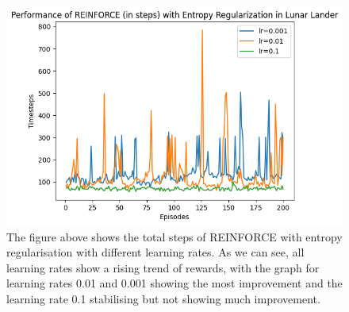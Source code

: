 \documentclass{article}
\begin{document}
\begin{figure}[htbp]
\centering
\includegraphics[width=0.9\linewidth]{Report/images/entropy_regularisation_2.png}
\caption{\label{fig:ReinforceEntropy_Rewards_Steps}The figure above shows the total steps of REINFORCE with entropy regularisation with different learning rates. As we can see, all learning rates show a rising trend of rewards, with the graph for learning rates 0.01 and 0.001 showing the most improvement and the learning rate 0.1 stabilising but not showing much improvement. }
\end{figure}

  
\end{document}

